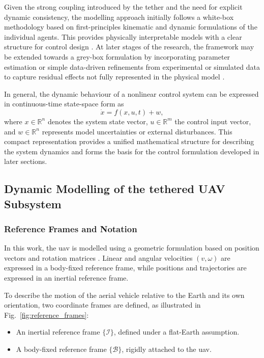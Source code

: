 Given the strong coupling introduced by the tether and the need for explicit dynamic consistency, the modelling approach initially follows a white-box methodology based on first-principles kinematic and dynamic formulations of the individual agents. This provides physically interpretable models with a clear structure for control design \citep{slotineAppliedNonlinearControl1991}. At later stages of the research, the framework may be extended towards a grey-box formulation by incorporating parameter estimation or simple data-driven refinements from experimental or simulated data to capture residual effects not fully represented in the physical model \citep{system_identification_Ljung,tangirala2013principles,houModelbasedControlDatadriven2013}.

In general, the dynamic behaviour of a nonlinear control system can be expressed in continuous-time state-space form as \citep{slotineAppliedNonlinearControl1991,rawlingsModelPredictiveControl2020}
\begin{equation}
\dot{x} = f(x, u, t) + w,
\end{equation}
where \(x \in \mathbb{R}^n\) denotes the system state vector, \(u \in \mathbb{R}^m\) the control input vector, and \(w \in \mathbb{R}^n\) represents model uncertainties or external disturbances. This compact representation provides a unified mathematical structure for describing the system dynamics and forms the basis for the control formulation developed in later sections.


\subsection{Dynamic Modelling of the tethered UAV Subsystem}
\subsubsection{Reference Frames and Notation}

In this work, the \gls{uav} is modelled using a geometric formulation based on position vectors and rotation matrices \citep{slotineAppliedNonlinearControl1991,beardSmallUnmannedAircraft2012}.
 Linear and angular velocities \((v, \omega)\) are expressed in a body-fixed reference frame, while positions and trajectories are expressed in an inertial reference frame.

To describe the motion of the aerial vehicle relative to the Earth and its own orientation, two coordinate frames are defined, as illustrated in Fig.~\ref{fig:reference_frames}:
\begin{itemize}
    \item An inertial reference frame \(\{\mathcal{I}\}\), defined under a flat-Earth assumption.
    \item A body-fixed reference frame \(\{\mathcal{B}\}\), rigidly attached to the \gls{uav}.
\end{itemize}

